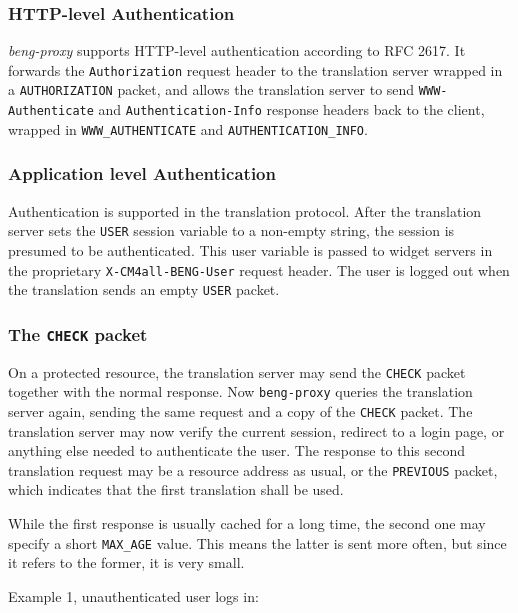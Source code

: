 \documentclass[a4paper,12pt]{article}
\begin{document}
\subsubsection{HTTP-level Authentication}

\emph{beng-proxy} supports HTTP-level authentication according to RFC
2617.  It forwards the \texttt{Authorization} request header to the
translation server wrapped in a \verb|AUTHORIZATION| packet, and
allows the translation server to send \texttt{WWW-Authenticate} and
\texttt{Authentication-Info} response headers back to the client,
wrapped in \verb|WWW_AUTHENTICATE| and \verb|AUTHENTICATION_INFO|.

\subsubsection{Application level Authentication}

Authentication is supported in the translation protocol.  After the
translation server sets the \verb|USER| session variable to a
non-empty string, the session is presumed to be authenticated.  This
user variable is passed to widget servers in the proprietary
\texttt{X-CM4all-BENG-User} request header.  The user is logged out
when the translation sends an empty \verb|USER| packet.

\subsubsection{The \texttt{CHECK} packet}

On a protected resource, the translation server may send the
\verb|CHECK| packet together with the normal response.  Now
\texttt{beng-proxy} queries the translation server again, sending the
same request and a copy of the \verb|CHECK| packet.  The translation
server may now verify the current session, redirect to a login page,
or anything else needed to authenticate the user.  The response to
this second translation request may be a resource address as usual, or
the \verb|PREVIOUS| packet, which indicates that the first
translation shall be used.

While the first response is usually cached for a long time, the second
one may specify a short \texttt{MAX\_AGE} value.  This means the latter
is sent more often, but since it refers to the former, it is very
small.

Example 1, unauthenticated user logs in:
\end{document}
